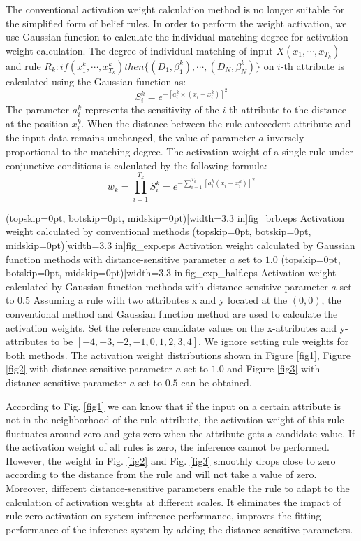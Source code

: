 \documentclass{ieeeaccess}
\begin{document}
The conventional activation weight calculation method is no longer suitable for the simplified form of belief rules.
In order to perform the weight activation, we use Gaussian function to calculate the individual matching degree for activation weight calculation.
The degree of individual matching of input $X(x_1,\cdots,x_{T_k})$ and rule $R_k:if(x_1^k , \cdots , x_{T_k}^k)then\{(D_1,\beta_1^k),\cdots,(D_N,\beta_N^k)\}$ on $i$-th attribute is calculated using the Gaussian function as:
\begin{equation}
    S_i^k=e^{-[a_i^k\times(x_i-x_i^k)]^2}
\end{equation}
The parameter $a_i^k$ represents the sensitivity of the $i$-th attribute to the distance at the position $x_i^k$. When the distance between the rule antecedent attribute and the input data remains unchanged,
the value of parameter $a$ inversely proportional to the matching degree.
The activation weight of a single rule under conjunctive conditions is calculated by the following formula:
\begin{equation}
    w_k=\prod_{i=1}^{T_k}S_i^k=e^{-\sum_{i=1}^{T_k}[a_i^k(x_i-x_i^k)]^2}
\end{equation}


\Figure[!t](topskip=0pt, botskip=0pt, midskip=0pt)[width=3.3 in]{fig_brb.eps}
{Activation weight calculated by conventional methods\label{fig1}}
\Figure[!t](topskip=0pt, botskip=0pt, midskip=0pt)[width=3.3 in]{fig_exp.eps}
{Activation weight calculated by Gaussian function methods with distance-sensitive parameter $a$ set to $1.0$\label{fig2}}
\Figure[!t](topskip=0pt, botskip=0pt, midskip=0pt)[width=3.3 in]{fig_exp_half.eps}
{Activation weight calculated by Gaussian function methods with distance-sensitive parameter $a$ set to $0.5$\label{fig3}}
Assuming a rule with two attributes x and y located at the $(0,0)$, the conventional method and Gaussian function method are used to calculate the activation weights.
Set the reference candidate values on the x-attributes and y-attributes to be $[-4,-3,-2,-1,0,1,2,3,4]$.
We ignore setting rule weights for both methods.
The activation weight distributions shown in Figure \ref{fig1},
Figure \ref{fig2} with distance-sensitive parameter $a$ set to $1.0$ and
Figure \ref{fig3} with distance-sensitive parameter $a$ set to $0.5$ can be obtained.

According to Fig. \ref{fig1} we can know that if the input on a certain attribute is not in the neighborhood of the rule attribute,
the activation weight of this rule fluctuates around zero and gets zero when the attribute gets a candidate value.
If the activation weight of all rules is zero, the inference cannot be performed.
However, the weight in Fig. \ref{fig2} and Fig. \ref{fig3} smoothly drops close to zero according to the distance from the rule and will not take a value of zero.
Moreover, different distance-sensitive parameters enable the rule to adapt to the calculation of activation weights at different scales.
It eliminates the impact of rule zero activation on system inference performance,
improves the fitting performance of the inference system by adding the distance-sensitive parameters.
\end{document}
